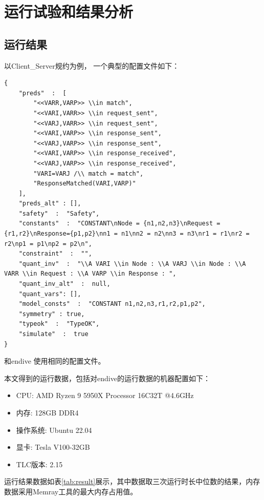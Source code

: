 \chapter{运行试验和结果分析}\label{chap:run-analysis}

\section{运行结果}

以{Client\_Server}规约为例， 一个典型的配置文件如下：
\begin{lstlisting}[label={lst:config},caption={配置文件}]
{
    "preds"  :  [
        "<<VARR,VARP>> \\in match",
        "<<VARI,VARR>> \\in request_sent",
        "<<VARJ,VARR>> \\in request_sent",
        "<<VARI,VARP>> \\in response_sent",
        "<<VARJ,VARP>> \\in response_sent",
        "<<VARI,VARP>> \\in response_received",
        "<<VARJ,VARP>> \\in response_received",
        "VARI=VARJ /\\ match = match",
        "ResponseMatched(VARI,VARP)"
    ],
    "preds_alt" : [],
    "safety"  :  "Safety",
    "constants"  :  "CONSTANT\nNode = {n1,n2,n3}\nRequest = {r1,r2}\nResponse={p1,p2}\nn1 = n1\nn2 = n2\nn3 = n3\nr1 = r1\nr2 = r2\np1 = p1\np2 = p2\n",
    "constraint"  :  "",
    "quant_inv"  :  "\\A VARI \\in Node : \\A VARJ \\in Node : \\A VARR \\in Request : \\A VARP \\in Response : ",
    "quant_inv_alt"  :  null,
    "quant_vars": [],
    "model_consts"  :  "CONSTANT n1,n2,n3,r1,r2,p1,p2",
    "symmetry" : true,
    "typeok"  :  "TypeOK",
    "simulate"  :  true      
}
\end{lstlisting}

\rltla 和endive 使用相同的配置文件。

本文得到的运行数据，包括对endive的运行数据的机器配置如下：
\begin{itemize}
    \item CPU: AMD Ryzen 9 5950X Processor 16C32T @4.6GHz
    \item 内存: 128GB DDR4 
    \item 操作系统: Ubuntu 22.04
    \item 显卡: Tesla V100-32GB
    \item TLC版本: 2.15
\end{itemize}
运行结果数据如表\ref{tab:result}展示，其中数据取三次运行时长中位数的结果，内存数据采用Memray工具的最大内存占用值。

